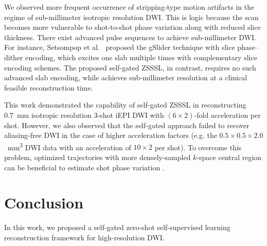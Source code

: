 \documentclass[journal,twoside,web]{ieeecolor}
\begin{document}
	We observed more frequent occurrence of stripping-type motion artifacts  
	in the regime of sub-millimeter isotropic resolution DWI. 
	This is logic because the scan becomes more vulnerable to 
	shot-to-shot phase variation along with reduced slice thickness. 
	There exist advanced pulse sequences to achieve sub-millimeter DWI.
	For instance, Setsompop et al.~\cite{setsompop_2018_gslider} 
	proposed the gSlider technique with slice phase–dither encoding, 
	which excites one slab multiple times with complementary slice encoding schemes.
	The proposed self-gated ZSSSL, in contrast, requires no such advanced slab encoding, 
	while achieves sub-millimeter resolution 
	at a clinical feasible reconstruction time.

	This work demonstrated the capability of self-gated ZSSSL in
	reconstructing \SI{0.7}{mm} isotropic resolution 3-shot iEPI DWI
	with $(6 \times 2)$-fold acceleration per shot.
	However, we also observed that the self-gated approach
	failed to recover aliasing-free DWI
	in the case of higher acceleration factors
	(e.g. the $0.5\times0.5\times2.0$~\si{mm^3} DWI data
	with an acceleration of $10\times2$ per shot).
	To overcome this problem, optimized trajectories
	with more densely-sampled $k$-space central region
	can be beneficial to estimate shot phase variation \cite{dai_2023_epti-diff}.

	\section{Conclusion}

	In this work, we proposed a self-gated zero-shot self-supervised learning
	reconstruction framework for high-resolution DWI.




	
	
\end{document}
